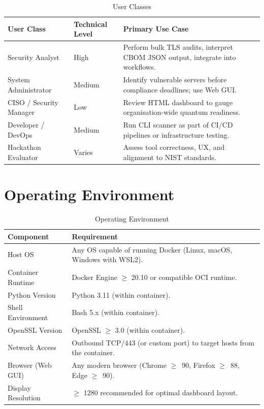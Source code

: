 \begin{table}[H]
  \centering
  \caption{User Classes}
  \label{tab:user_classes}
  \begin{tabularx}{\textwidth}{L{2.8cm} L{3.5cm} L{8cm}}
    \toprule
    \textbf{User Class} & \textbf{Technical Level} & \textbf{Primary Use Case} \\
    \midrule
    Security Analyst    & High   & Perform bulk TLS audits, interpret CBOM
                                   JSON output, integrate into workflows. \\
    System Administrator & Medium & Identify vulnerable servers before
                                   compliance deadlines; use Web GUI. \\
    CISO / Security Manager & Low & Review HTML dashboard to gauge
                                   organisation-wide quantum readiness. \\
    Developer / DevOps  & Medium & Run CLI scanner as part of CI/CD pipelines
                                   or infrastructure testing. \\
    Hackathon Evaluator & Varies & Assess tool correctness, UX, and alignment
                                   to NIST standards. \\
    \bottomrule
  \end{tabularx}
\end{table}

\section{Operating Environment}
\label{sec:operating_env}

\begin{table}[H]
  \centering
  \caption{Operating Environment}
  \label{tab:operating_env}
  \begin{tabularx}{\textwidth}{L{3.5cm} L{10cm}}
    \toprule
    \textbf{Component}       & \textbf{Requirement} \\
    \midrule
    Host OS                  & Any OS capable of running Docker (Linux,
                               macOS, Windows with WSL2). \\
    Container Runtime        & Docker Engine $\geq$ 20.10 or compatible
                               OCI runtime. \\
    Python Version           & Python 3.11 (within container). \\
    Shell Environment        & Bash 5.x (within container). \\
    OpenSSL Version          & OpenSSL $\geq$ 3.0 (within container). \\
    Network Access           & Outbound TCP/443 (or custom port) to target
                               hosts from the container. \\
    Browser (Web GUI)        & Any modern browser (Chrome $\geq$~90,
                               Firefox $\geq$~88, Edge $\geq$~90). \\
    Display Resolution       & $\geq$ 1280 recommended for
                               optimal dashboard layout. \\
    \bottomrule
  \end{tabularx}
\end{table}

